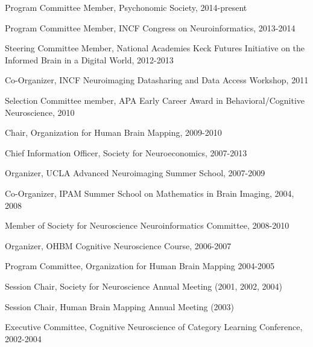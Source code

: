 \documentclass[10pt, letterpaper]{article}
\begin{document}
Program Committee Member, Psychonomic Society, 2014-present \vspace{2mm} 

Program Committee Member, INCF Congress on Neuroinformatics, 2013-2014\vspace{2mm} 

Steering Committee Member, National Academies Keck Futures Initiative on the Informed Brain in a Digital World, 2012-2013\vspace{2mm}

Co-Organizer, INCF Neuroimaging Datasharing and Data Access Workshop, 2011\vspace{2mm}

Selection Committee member, APA Early Career Award in Behavioral/Cognitive Neuroscience, 2010\vspace{2mm} 

Chair, Organization for Human Brain Mapping, 2009-2010\vspace{2mm} 

Chief Information Officer, Society for Neuroeconomics, 2007-2013\vspace{2mm} 

Organizer, UCLA Advanced Neuroimaging Summer School, 2007-2009\vspace{2mm} 

Co-Organizer, IPAM Summer School on Mathematics in Brain Imaging, 2004, 2008\vspace{2mm} 

Member of Society for Neuroscience Neuroinformatics Committee, 2008-2010\vspace{2mm} 

Organizer, OHBM Cognitive Neuroscience Course, 2006-2007\vspace{2mm} 

Program Committee, Organization for Human Brain Mapping 2004-2005\vspace{2mm} 

Session Chair, Society for Neuroscience Annual Meeting (2001, 2002, 2004)\vspace{2mm} 

Session Chair, Human Brain Mapping Annual Meeting (2003)\vspace{2mm} 

Executive Committee, Cognitive Neuroscience of Category Learning Conference, 2002-2004\vspace{2mm} 

\end{document}

